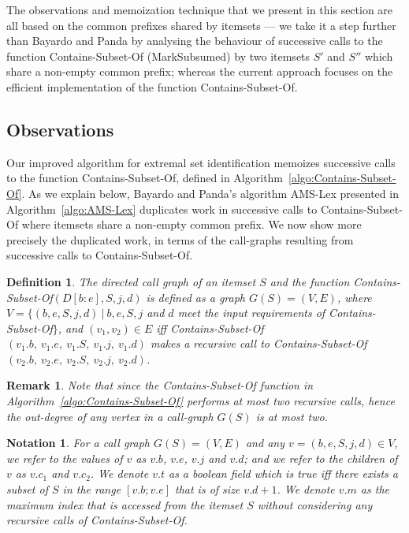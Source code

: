 \documentclass[13pt,a4paper]{article}
\newtheorem{definition}[theorem]{Definition}
\newtheorem{notation}[theorem]{Notation}
\newtheorem{remark}[theorem]{Remark}
\begin{document}
The observations and memoization technique that we present in this section are all based on the common prefixes shared by itemsets --- we take it a step further than Bayardo and Panda by analysing the behaviour of successive calls to the function Contains-Subset-Of (MarkSubsumed) by two itemsets $S'$ and $S''$ which share a non-empty common prefix; whereas the current approach \cite{BayardoPanda11} focuses on the efficient implementation of the function Contains-Subset-Of.

\subsection{Observations}
Our improved algorithm for extremal set identification memoizes successive calls to the function Contains-Subset-Of, defined in Algorithm~\ref{algo:Contains-Subset-Of}. As we explain below, Bayardo and Panda's algorithm AMS-Lex presented in Algorithm~\ref{algo:AMS-Lex} duplicates work in successive calls to Contains-Subset-Of where itemsets share a non-empty common prefix. We now show more precisely the duplicated work, in terms of the call-graphs resulting from successive calls to Contains-Subset-Of.

\begin{definition}
\label{def:call_graph}
The directed call graph of an itemset $S$ and the function Contains-Subset-Of$(D[b:e], S, j, d)$ is defined as a graph $G(S) = (V, E)$, where $V = \{(b, e, S, j, d) ~\lvert~ b, e, S, j$ and $d$ meet the input requirements of Contains-Subset-Of$\}$, and $(v_1, v_2) \in E$ iff Contains-Subset-Of$(v_1.b,~v_1.e,~v_1.S,~v_1.j,~v_1.d)$ makes a recursive call to Contains-Subset-Of$(v_2.b,~v_2.e,~v_2.S,~v_2.j,~v_2.d)$.
\end{definition}

\begin{remark}
\label{RemarkOutDegreeOfGraph}
Note that since the Contains-Subset-Of function in Algorithm~\ref{algo:Contains-Subset-Of} performs at most two recursive calls, hence the out-degree of any vertex in a call-graph $G(S)$ is at most two. 
\end{remark}

\begin{notation}
For a call graph $G(S) = (V, E)$ and any $v = (b, e, S, j, d) \in V$, we refer to the values of $v$ as $v.b$, $v.e$, $v.j$ and $v.d$; and we refer to the children of $v$ as $v.c_1$ and $v.c_2$. We denote $v.t$ as a boolean field which is true iff there exists a subset of $S$ in the range $[v.b;v.e]$ that is of size $ v.d+1 $. We denote $v.m$ as the maximum index that is accessed from the itemset $S$ without considering any recursive calls of Contains-Subset-Of.
\end{notation}
\end{document}
